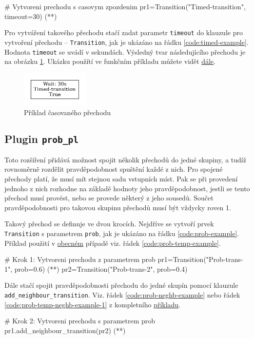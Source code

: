 \begin{python}
 # Vytvoreni prechodu s casovym zpozdenim
 pr1=Transition("Timed-transition", timeout=30) (*\label{code:timed-example}*)
\end{python}

Pro vytváření takového přechodu stačí zadat parametr \texttt{timeout} do klauzule pro vytvoření přechodu -- \texttt{Transition}, jak je ukázáno na řádku \ref{code:timed-example}. Hodnota \texttt{timeout} se uvádí v sekundách. Výsledný tvar následujícího přechodu je na obrázku \ref{timed-transition}. Ukázku použítí ve funkčním příkladu můžete vidět \hyperref[code:timed-temp-example]{dále}.

\begin{figure}[hbt]
 \centering
 \includegraphics[width=0.3\textwidth]{obrazky-figures/timed-transition.png}
 \caption{Příklad časovaného přechodu}
 \label{timed-transition}
\end{figure}

\subsection{Plugin \texttt{prob\_pl}}
\label{subsec:prob_pl}
Toto rozšíření přidává možnost spojit několik přechodů do jedné skupiny, a tudíž rovnoměrně rozdělit pravděpodobnost spuštění každé z nich. Pro spojené přechody platí, že musí mít stejnou sadu vstupních míst. Pak se při provedení jednoho z nich rozhodne na základě hodnoty jeho pravděpodobnost, jestli se tento přechod musí provést, nebo se provede některý z jeho sousedů. Součet pravděpodobnosti pro takovou skupinu přechodů musí být vždycky roven 1.

Takový přechod se definuje ve dvou krocích. Nejdříve se vytvoří prvek \texttt{Transition} s parametrem \texttt{prob}, jak je ukázáno na řádku \ref{code:prob-example}. Příklad použití v \hyperref[code:prob-ev-draw]{obecném} případě viz. řádek \ref{code:prob-temp-example}.
\begin{python}
 # Krok 1: Vytvoreni prechodu z parametrem prob
 pr1=Transition("Prob-trans-1", prob=0.6) (*\label{code:prob-example}*)
 pr2=Transition("Prob-trans-2", prob=0.4)
\end{python}

Dále stačí spojit pravděpodobnosti přechodu do jedné skupín pomocí klauzule \\ \texttt{add\_neighbour\_transition}. Viz. řádek \ref{code:prob-neghb-example} nebo řádek \ref{code:prob-temp-neghb-example-1} z kompletního \hyperref[code:prob-ev-draw]{příkladu}.
\begin{python}
 # Krok 2: Vytvoreni prechodu s parametrem prob
 pr1.add_neighbour_transition(pr2) (*\label{code:prob-neghb-example}*)
\end{python}

